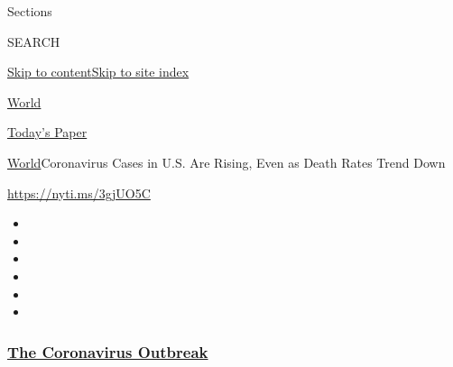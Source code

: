 Sections

SEARCH

\protect\hyperlink{site-content}{Skip to
content}\protect\hyperlink{site-index}{Skip to site index}

\href{https://www.nytimes3xbfgragh.onion/section/world}{World}

\href{https://myaccount.nytimes3xbfgragh.onion/auth/login?response_type=cookie\&client_id=vi}{}

\href{https://www.nytimes3xbfgragh.onion/section/todayspaper}{Today's
Paper}

\href{/section/world}{World}\textbar{}Coronavirus Cases in U.S. Are
Rising, Even as Death Rates Trend Down

\url{https://nyti.ms/3gjUO5C}

\begin{itemize}
\item
\item
\item
\item
\item
\item
\end{itemize}

\hypertarget{the-coronavirus-outbreak}{%
\subsubsection{\texorpdfstring{\href{https://www.nytimes3xbfgragh.onion/news-event/coronavirus?name=styln-coronavirus-national\&region=TOP_BANNER\&variant=undefined\&block=storyline_menu_recirc\&action=click\&pgtype=Article\&impression_id=4a62ac60-e39e-11ea-9e73-bd3f3155e7f4}{The
Coronavirus
Outbreak}}{The Coronavirus Outbreak}}\label{the-coronavirus-outbreak}}

